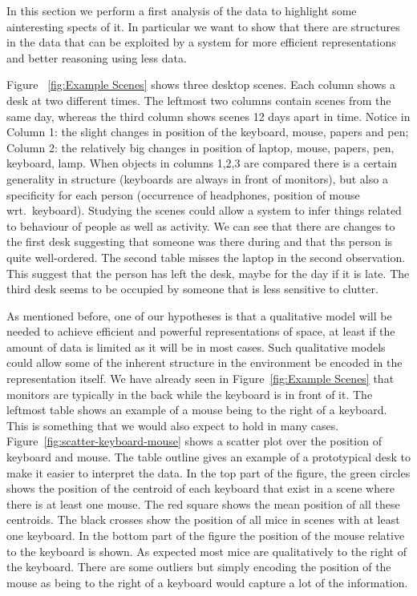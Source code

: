 \documentclass[letterpaper, 10 pt, conference]{ieeeconf}  %
\begin{document}
In this section we perform a first analysis of the data to highlight some ainteresting spects of it. In particular we want to show that 
there are structures in the data that can be exploited by a system for more efficient representations and better reasoning using less data.

Figure ~\ref{fig:Example Scenes} shows three desktop scenes. Each column shows a desk at two different times. The leftmost two columns 
contain scenes from the same day, whereas the third column shows scenes 12 days apart in time. Notice in Column 1: the slight changes in 
position of the keyboard, mouse, papers and pen; Column 2: the relatively big changes in position of laptop, mouse, papers, pen, keyboard, 
lamp. When objects in columns 1,2,3 are compared there is a certain generality in structure (keyboards are always in front of monitors), but 
also a specificity for each person (occurrence of headphones, position of mouse wrt.\ keyboard). Studying the scenes could allow a system to 
infer things related to behaviour of people as well as activity. We can see that there are changes to the first desk suggesting that someone 
was there during and that ths person is quite well-ordered. The second table misses the laptop in the second observation. This suggest that 
the person has left the desk, maybe for the day if it is late. The third desk seems to be occupied by someone that is less sensitive to 
clutter.

As mentioned before, one of our hypotheses is that a qualitative model will be needed to achieve efficient and powerful representations of 
space, at least if the amount of data is limited as it will be in most cases. Such qualitative models could allow some of the inherent 
structure in the environment be encoded in the representation itself. We have already seen in Figure~\ref{fig:Example Scenes} that monitors 
are typically in the back while the keyboard is in front of it. The leftmost table shows an example of a mouse being to the right of a 
keyboard. This is something that we would also expect to hold in many cases. Figure~\ref{fig:scatter-keyboard-mouse} shows a scatter plot 
over the position of keyboard and mouse. The table outline gives an example of a prototypical desk to make it easier to interpret the data. 
In the top part of the figure, the green circles shows the position of the centroid of each 
keyboard that exist in a scene where there is at least one mouse. The red square shows the mean position of all these centroids. The black 
crosses show the position of all mice in scenes with at least one keyboard. In the bottom part of the figure the position of the mouse 
relative to the keyboard is shown. As expected most mice are qualitatively to the right of the keyboard. There are some outliers but simply 
encoding the position of the mouse as being to the right of a keyboard would capture a lot of the information. 
\end{document}
